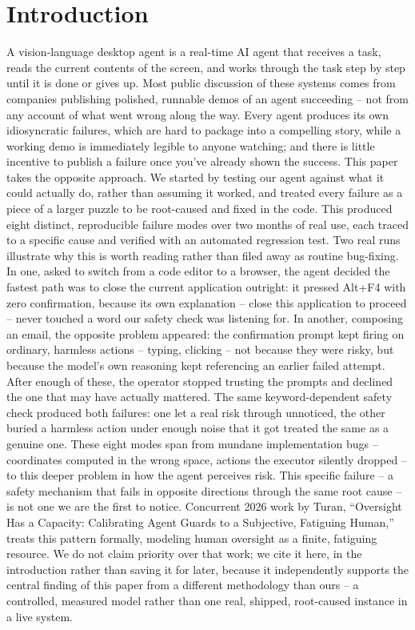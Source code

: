 \documentclass[11pt]{article}
\begin{document}
\section{Introduction}
\label{sec:intro}
A vision-language desktop agent is a real-time AI agent that receives a task, reads the current contents of the screen, and works through the task step by step until it is done or gives up. Most public discussion of these systems comes from companies publishing polished, runnable demos of an agent succeeding -- not from any account of what went wrong along the way. Every agent produces its own idiosyncratic failures, which are hard to package into a compelling story, while a working demo is immediately legible to anyone watching; and there is little incentive to publish a failure once you've already shown the success. This paper takes the opposite approach.
We started by testing our agent against what it could actually do, rather than assuming it worked, and treated every failure as a piece of a larger puzzle to be root-caused and fixed in the code. This produced eight distinct, reproducible failure modes over two months of real use, each traced to a specific cause and verified with an automated regression test.
Two real runs illustrate why this is worth reading rather than filed away as routine bug-fixing. In one, asked to switch from a code editor to a browser, the agent decided the fastest path was to close the current application outright: it pressed Alt+F4 with zero confirmation, because its own explanation -- close this application to proceed -- never touched a word our safety check was listening for. In another, composing an email, the opposite problem appeared: the confirmation prompt kept firing on ordinary, harmless actions -- typing, clicking -- not because they were risky, but because the model's own reasoning kept referencing an earlier failed attempt. After enough of these, the operator stopped trusting the prompts and declined the one that may have actually mattered. The same keyword-dependent safety check produced both failures: one let a real risk through unnoticed, the other buried a harmless action under enough noise that it got treated the same as a genuine one.
These eight modes span from mundane implementation bugs -- coordinates computed in the wrong space, actions the executor silently dropped -- to this deeper problem in how the agent perceives risk.
This specific failure -- a safety mechanism that fails in opposite directions through the same root cause -- is not one we are the first to notice. Concurrent 2026 work by Turan, ``Oversight Has a Capacity: Calibrating Agent Guards to a Subjective, Fatiguing Human,'' treats this pattern formally, modeling human oversight as a finite, fatiguing resource. We do not claim priority over that work; we cite it here, in the introduction rather than saving it for later, because it independently supports the central finding of this paper from a different methodology than ours -- a controlled, measured model rather than one real, shipped, root-caused instance in a live system.
\end{document}
